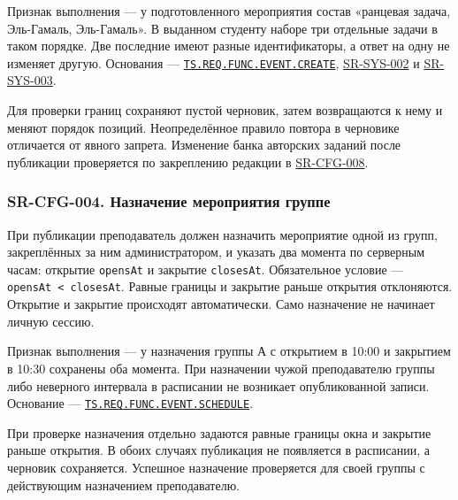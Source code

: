 \documentclass[12pt,a4paper]{article}
\begin{document}
Признак выполнения --- у подготовленного мероприятия состав «ранцевая задача, Эль-Гамаль, Эль-Гамаль». В выданном студенту наборе три отдельные задачи в таком порядке. Две последние имеют разные идентификаторы, а ответ на одну не изменяет другую. Основания --- {\href{../02\_Техническое\_задание/DOC-02\_Техническое\_задание.pdf\#ts-req-func-event-create}{\texttt{TS.\allowbreak{}REQ.\allowbreak{}FUNC.\allowbreak{}EVENT.\allowbreak{}CREATE}}}, {\hyperlink{sr-sys-002}{SR-SYS-002}} и {\hyperlink{sr-sys-003}{SR-SYS-003}}.

Для проверки границ сохраняют пустой черновик, затем возвращаются к нему и меняют порядок позиций. Неопределённое правило повтора в черновике отличается от явного запрета. Изменение банка авторских заданий после публикации проверяется по закреплению редакции в {\hyperlink{sr-cfg-008}{SR-CFG-008}}.

\subsubsection{SR-CFG-004. Назначение мероприятия группе}\label{sr-cfg-004-ux43dux430ux437ux43dux430ux447ux435ux43dux438ux435-ux43cux435ux440ux43eux43fux440ux438ux44fux442ux438ux44f-ux433ux440ux443ux43fux43fux435}

\hypertarget{sr-cfg-004-назначение-мероприятия-группе}{}

\hypertarget{sr-cfg-004}{}

При публикации преподаватель должен назначить мероприятие одной из групп, закреплённых за ним администратором, и указать два момента по серверным часам: открытие \texttt{opensAt} и закрытие \texttt{closesAt}. Обязательное условие --- \texttt{opensAt\ \textless{}\ closesAt}. Равные границы и закрытие раньше открытия отклоняются. Открытие и закрытие происходят автоматически. Само назначение не начинает личную сессию.

Признак выполнения --- у назначения группы А с открытием в 10:00 и закрытием в 10:30 сохранены оба момента. При назначении чужой преподавателю группы либо неверного интервала в расписании не возникает опубликованной записи. Основание --- {\href{../02\_Техническое\_задание/DOC-02\_Техническое\_задание.pdf\#ts-req-func-event-schedule}{\texttt{TS.\allowbreak{}REQ.\allowbreak{}FUNC.\allowbreak{}EVENT.\allowbreak{}SCHEDULE}}}.

При проверке назначения отдельно задаются равные границы окна и закрытие раньше открытия. В обоих случаях публикация не появляется в расписании, а черновик сохраняется. Успешное назначение проверяется для своей группы с действующим назначением преподавателю.
\end{document}
